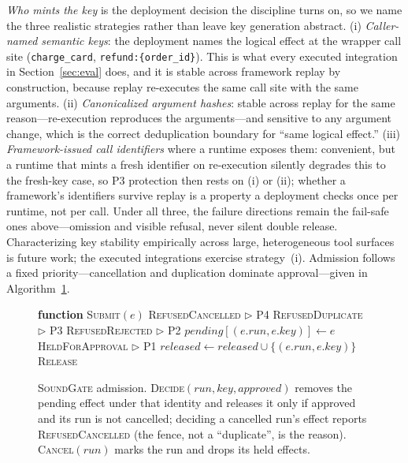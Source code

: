 \documentclass[10pt,journal,compsoc]{IEEEtran}
\newcommand{\sys}{\textsc{SoundGate}}
\begin{document}
\emph{Who mints the key} is the deployment decision the discipline turns on,
so we name the three realistic strategies rather than leave key generation
abstract. (i) \emph{Caller-named semantic keys}: the deployment names the
logical effect at the wrapper call site (\texttt{charge\_card},
\texttt{refund:\{order\_id\}}). This is what every executed integration in
Section~\ref{sec:eval} does, and it is stable across framework replay by
construction, because replay re-executes the same call site with the same
arguments. (ii) \emph{Canonicalized argument hashes}: stable across replay
for the same reason---re-execution reproduces the arguments---and sensitive
to any argument change, which is the correct deduplication boundary for
``same logical effect.'' (iii) \emph{Framework-issued call identifiers}
where a runtime exposes them: convenient, but a runtime that mints a fresh
identifier on re-execution silently degrades this to the fresh-key case, so
P3 protection then rests on (i) or (ii); whether a framework's identifiers
survive replay is a property a deployment checks once per runtime, not per
call. Under all three, the failure directions remain the fail-safe ones
above---omission and visible refusal, never silent double release.
Characterizing key stability empirically across large, heterogeneous tool
surfaces is future work; the executed integrations exercise strategy~(i).
Admission follows
a fixed
priority---cancellation and duplication dominate approval---given in
Algorithm~\ref{alg:submit}.

\begin{figure}[!t]
\begin{algorithmic}[1]
\STATE \textbf{function} \textsc{Submit}$(e)$
  \RETURN \textsc{RefusedCancelled} \hfill$\triangleright$ P4
\ENDIF
{}
  \RETURN \textsc{RefusedDuplicate} \hfill$\triangleright$ P3
\ENDIF
{}
  \RETURN \textsc{RefusedRejected} \hfill$\triangleright$ P2
\ENDIF
{}
  \STATE $\mathit{pending}[(e.\mathit{run},e.\mathit{key})] \gets e$
  \RETURN \textsc{HeldForApproval} \hfill$\triangleright$ P1
\ELSE
  \STATE $\mathit{released} \gets \mathit{released} \cup \{(e.\mathit{run},e.\mathit{key})\}$
  \RETURN \textsc{Release}
\ENDIF
\end{algorithmic}
\caption{\sys{} admission. \textsc{Decide}$(\mathit{run},\mathit{key},\mathit{approved})$
removes the pending effect under that identity and releases it only if approved
and its run is not cancelled; deciding a cancelled run's effect reports
\textsc{RefusedCancelled} (the fence, not a ``duplicate'', is the reason).
\textsc{Cancel}$(\mathit{run})$ marks the run and drops its held effects.}
\label{alg:submit}
\end{figure}
\end{document}
